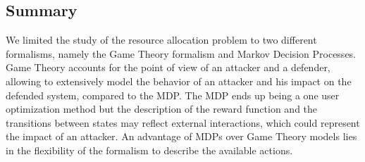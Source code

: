 
\subsection{Summary}
We limited the study of the resource allocation problem to two different formalisms, namely the Game Theory formalism and Markov Decision Processes. 
Game Theory accounts for the point of view of an attacker and a defender, allowing to extensively model the behavior of an attacker and his impact on the defended system, compared to the MDP.
The MDP ends up being a one user optimization method but the description of the reward function and the transitions between states may reflect external interactions, which could represent the impact of an attacker.
An advantage of MDPs over Game Theory models lies in the flexibility of the formalism to describe the available actions.

